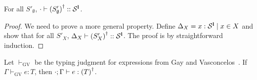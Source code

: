 \begin{lemma}
  For all $S'_\emptyset$, $\cdot \vdash {(S'_\emptyset)}^\dagger :: \mathcal S^{\mathbf{l}}$.
\end{lemma}
\begin{proof}
  We need to prove a more general property.  Define
  $\Delta_X = x : \mathcal S^{\mathbf{l}} \mid x \in X$ and show that for all
  $S'_X$, $\Delta_X \vdash {(S'_X)}^\dagger :: \mathcal S^{\mathbf{l}}$. The proof
  is by straightforward induction.
\end{proof}
\begin{lemma}
  Let $\vdash_{\text{GV}}$ be the typing judgment for expressions from
  Gay and Vasconcelos~\cite{DBLP:journals/jfp/GayV10}.  If
  $\Gamma \vdash_{\text{GV}} e : T$, then
  $\cdot; \Gamma \vdash e : {(T)}^\dagger$.
\end{lemma}


